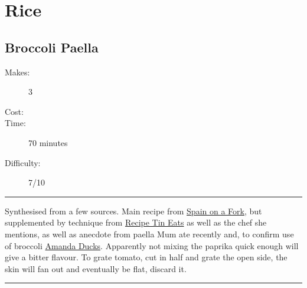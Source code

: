 \documentclass[]{article}
\begin{document}
\section*{\center\Huge\color{accent}Rice}
\label{cat:Rice}
\label{rec:Broccoli Paella}
\subsection*{\center\huge Broccoli Paella}
\begin{description}
\item[Makes:] 3 
\item[Cost:] \textdollar
\item[Time:] 70 minutes
\item[Difficulty:] 7/10
\end{description}
\vspace{0.2cm}\hrule\vspace{0.5cm}
\begin{adjustwidth}{0.5 cm}{0.5 cm}

Synthesised from a few sources. Main recipe from \href{https://spainonafork.com/authentic-spanish-vegetable-paella-recipe/}{Spain on a Fork}, but supplemented by technique from \href{https://www.recipetineats.com/spanish-paella/}{Recipe Tin Eats} as well as the chef she mentions, as well as anecdote from paella Mum ate recently and, to confirm use of broccoli \href{https://www.amandaducks.com/recipes/capsicum-paella}{Amanda Ducks}. Apparently not mixing the paprika quick enough will give a bitter flavour. To grate tomato, cut in half and grate the open side, the skin will fan out and eventually be flat, discard it. \hfill{}\color{black}

\end{adjustwidth}
\vspace{0.5cm}\hrule
\end{document}
